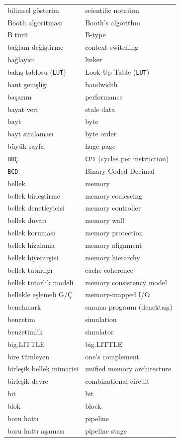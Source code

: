 {\begin{longtable}{@{}p{7.6cm}p{7.6cm}@{}}
bilimsel gösterim & scientific notation \\
Booth algoritması & Booth's algorithm \\
B türü & B-type \\
bağlam değiştirme & context switching \\
bağlayıcı & linker \\
bakış tablosu (\texttt{LUT}) & Look-Up Table (\texttt{LUT}) \\
bant genişliği & bandwidth \\
başarım & performance \\
bayat veri & stale data \\
bayt & byte \\
bayt sıralaması & byte order \\
büyük sayfa & huge page \\
\texttt{BBÇ} & \texttt{CPI} (cycles per instruction) \\
\texttt{BCD} & Binary-Coded Decimal \\
bellek & memory \\
bellek birleştirme & memory coalescing \\
bellek denetleyicisi & memory controller \\
bellek duvarı & memory wall \\
bellek koruması & memory protection \\
bellek hizalama & memory alignment \\
bellek hiyerarşisi & memory hierarchy \\
bellek tutarlığı & cache coherence \\
bellek tutarlık modeli & memory consistency model \\
bellekle eşlemeli G/Ç & memory-mapped I/O \\
benchmark & sınama programı (denektaşı) \\
benzetim & simulation \\
benzetimlik & simulator \\
big.LITTLE & big.LITTLE \\
bire tümleyen & one's complement \\
birleşik bellek mimarisi & unified memory architecture \\
birleşik devre & combinational circuit \\
bit & bit \\
blok & block \\
boru hattı & pipeline \\
boru hattı aşaması & pipeline stage \\

\end{longtable}}
